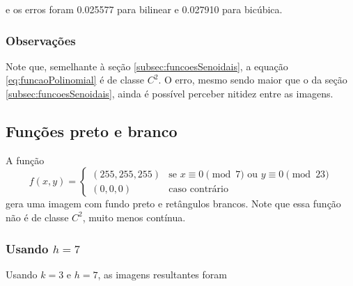 \documentclass{article}
\begin{document}
e os erros foram 0.025577 para bilinear e 0.027910 para bicúbica.

\subsubsection{Observações}

Note que, semelhante à seção \ref{subsec:funcoesSenoidais},
a equação \ref{eq:funcaoPolinomial} é de classe $C^2$. O erro,
mesmo sendo maior que o da seção \ref{subsec:funcoesSenoidais},
ainda é possível perceber nitidez entre as imagens.

\subsection{Funções preto e branco}

A função 
\begin{equation}
  f(x,y) = \begin{cases}
    (255, 255, 255) &\text{se } x \equiv 0 \pmod 7 \text{ ou } y \equiv 0 \pmod{23} \\
    (0, 0, 0) &\text{caso contrário}  
  \end{cases}
\end{equation}
gera uma imagem com fundo preto e retângulos brancos.
Note que essa função não é de classe $C^2$, muito menos contínua.

\subsubsection[Usando h=7]{Usando $h=7$}

Usando $k=3$ e $h=7$, as imagens resultantes foram
\end{document}

